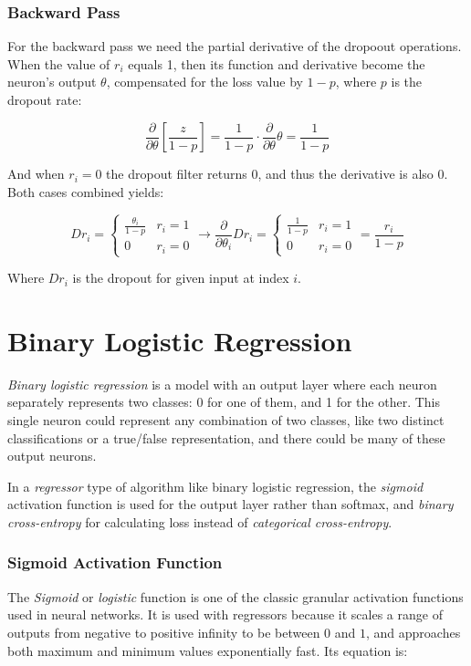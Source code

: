 \documentclass[a4paper]{article}
\begin{document}
\subsubsection*{Backward Pass}
For the backward pass we need the partial derivative of the dropoout operations. When the value of $r_i$ equals 1, then its function and derivative become the neuron's output $\theta$, compensated for the loss value by $1-p$, where $p$ is the dropout rate:

\begin{equation*}
    \frac{\partial}{\partial\theta}\left[\frac{z}{1-p}\right] = \frac{1}{1-p} \cdot \frac{\partial}{\partial\theta}\theta = \frac{1}{1-p}
\end{equation*}

And when $r_i = 0$ the dropout filter returns $0$, and thus the derivative is also $0$. Both cases combined yields:

\begin{equation*}
    Dr_i = \begin{cases}
        \frac{\theta_i}{1-p} & r_i = 1 \\
        0 & r_i = 0
    \end{cases} \rightarrow \frac{\partial}{\partial\theta_i}Dr_i = \begin{cases}
        \frac{1}{1-p} & r_i = 1 \\
        0 & r_i = 0
    \end{cases} = \frac{r_i}{1-p}
\end{equation*}

Where $Dr_i$ is the dropout for given input at index $i$.

\section*{Binary Logistic Regression}
\emph{Binary logistic regression} is a model with an output layer where each neuron separately represents two classes: 0 for one of them, and 1 for the other. This single neuron could represent any combination of two classes, like two distinct classifications or a true/false representation, and there could be many of these output neurons.

In a \emph{regressor} type of algorithm like binary logistic regression, the \emph{sigmoid} activation function is used for the output layer rather than softmax, and \emph{binary cross-entropy} for calculating loss instead of \emph{categorical cross-entropy}.

\subsubsection*{Sigmoid Activation Function}
The \emph{Sigmoid} or \emph{logistic} function is one of the classic granular activation functions used in neural networks. It is used with regressors because it scales a range of outputs from negative to positive infinity to be between $0$ and $1$, and approaches both maximum and minimum values exponentially fast. Its equation is:
\end{document}
